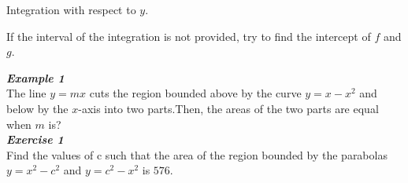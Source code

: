 \documentclass[12px]{article}
\begin{document}
\begin{enumerate}
\begin{enumerate}[(1)]
\begin{center}
\begin{multicols}{2}
                \begin{center}
                    Integration with respect to $y$.
                \end{center}
            \end{multicols}
        \end{center}
    \end{enumerate}
    \hspace*{2em} If the interval of the integration is not provided, try to find the intercept of $f$ and $g$.
    \begin{multicols}{2}
        \textit{\textbf{Example 1}}\\
        The line $y=mx$ cuts the region bounded above by the curve $y=x-x^2$ and below by the $x$-axis into two parts.Then, the areas of the two parts are equal when $m$ is?\\
        \textit{\textbf{Exercise 1}}\\
        Find the values of c such that the area of the region bounded by the parabolas $y=x^2-c^2$ and $y=c^2-x^2$ is $576$.
    \end{multicols}
\newpage


\end{enumerate}
\end{document}
